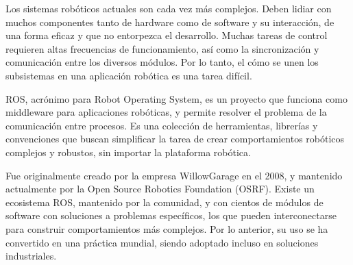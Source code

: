 Los sistemas rob\'oticos actuales son cada vez m\'as complejos. Deben lidiar con muchos componentes tanto de hardware como de software y su interacci\'on, de una forma eficaz y que no entorpezca el desarrollo. Muchas tareas de control requieren altas frecuencias de funcionamiento, as\'i como la sincronizaci\'on y comunicaci\'on entre los diversos m\'odulos. Por lo tanto, el c\'omo se unen los subsistemas en una aplicaci\'on rob\'otica es una tarea dif\'icil.

ROS\cite{ROS:2009}, acr\'onimo para Robot Operating System, es un proyecto que funciona como middleware para aplicaciones rob\'oticas, y permite resolver el problema de la comunicaci\'on entre procesos. Es una colecci\'on de herramientas, librer\'ias y convenciones que buscan simplificar la tarea de crear comportamientos rob\'oticos complejos y robustos, sin importar la plataforma rob\'otica.

Fue originalmente creado por la empresa WillowGarage en el 2008, y mantenido actualmente por la Open Source Robotics Foundation (OSRF). Existe un ecosistema ROS, mantenido por la comunidad, y con cientos de m\'odulos de software con soluciones a problemas espec\'ificos, los que pueden interconectarse para construir comportamientos m\'as complejos. Por lo anterior, su uso se ha convertido en una pr\'actica mundial, siendo adoptado incluso en soluciones industriales.


%
%
%
%
%

